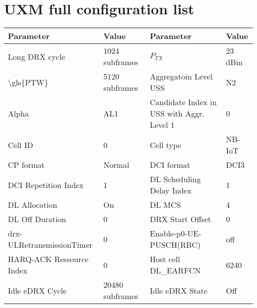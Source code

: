 \section{UXM full configuration list}

\begin{longtable}{|*4{p{3cm}|}} \hline
\textbf{Parameter}                                      & \textbf{Value}     & \textbf{Parameter}                        & \textbf{Value}     \\ \hline
Long DRX cycle                                          & 1024 subframes     & $P_{TX}$                                  & 23 dBm             \\ \hline
\textbackslash{}gls\{PTW\}                              & 5120 subframes     & Aggregatoin Level USS                     & N2                 \\ \hline
Alpha                                                   & AL1                & Candidate Index in USS with Aggr. Level 1 & 0                  \\ \hline
Cell ID                                                 & 0                  & Cell type                                 & NB-IoT             \\ \hline
CP format                                               & Normal             & DCI format                                & DCI3               \\ \hline
DCI Repetition Index                                    & 1                  & DL  Scheduling Delay Index                & 1                  \\ \hline
DL Allocation                                           & On                 & DL MCS                                    & 4                  \\ \hline
DL Off Duration                                         & 0                  & DRX Start Offset                          & 0                  \\ \hline
drx-ULRetransmissionTimer                               & 0                  & Enable-p0-UE-PUSCH(RBC)                   & off                \\ \hline
HARQ-ACK Ressource Index                                & 0                  & Host cell DL\_EARFCN                      & 6240               \\ \hline
Idle eDRX Cycle                                         & 20480 subframes    & Idle eDRX State                           & Off                \\ \hline

\end{longtable}
